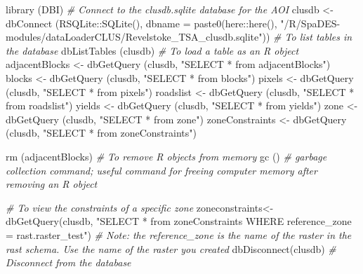 \documentclass[
]{article}
\newenvironment{Shaded}{\begin{snugshade}}{\end{snugshade}}
\newcommand{\AttributeTok}[1]{\textcolor[rgb]{0.77,0.63,0.00}{#1}}
\newcommand{\CommentTok}[1]{\textcolor[rgb]{0.56,0.35,0.01}{\textit{#1}}}
\newcommand{\FunctionTok}[1]{\textcolor[rgb]{0.00,0.00,0.00}{#1}}
\newcommand{\NormalTok}[1]{#1}
\newcommand{\OtherTok}[1]{\textcolor[rgb]{0.56,0.35,0.01}{#1}}
\newcommand{\SpecialCharTok}[1]{\textcolor[rgb]{0.00,0.00,0.00}{#1}}
\newcommand{\StringTok}[1]{\textcolor[rgb]{0.31,0.60,0.02}{#1}}
\begin{document}
\begin{Shaded}
\begin{Highlighting}[]
\FunctionTok{library}\NormalTok{ (DBI)}
\CommentTok{\# Connect to the clusdb.sqlite database for the AOI}
\NormalTok{clusdb }\OtherTok{\textless{}{-}} \FunctionTok{dbConnect}\NormalTok{ (RSQLite}\SpecialCharTok{::}\FunctionTok{SQLite}\NormalTok{(), }\AttributeTok{dbname =} \FunctionTok{paste0}\NormalTok{(here}\SpecialCharTok{::}\FunctionTok{here}\NormalTok{(), }\StringTok{"/R/SpaDES{-}modules/dataLoaderCLUS/Revelstoke\_TSA\_clusdb.sqlite"}\NormalTok{)) }
\CommentTok{\# To list tables in the database}
\FunctionTok{dbListTables}\NormalTok{ (clusdb)}
\CommentTok{\# To load a table as an R object}
\NormalTok{adjacentBlocks }\OtherTok{\textless{}{-}} \FunctionTok{dbGetQuery}\NormalTok{ (clusdb, }\StringTok{"SELECT * from adjacentBlocks"}\NormalTok{)}
\NormalTok{blocks }\OtherTok{\textless{}{-}} \FunctionTok{dbGetQuery}\NormalTok{ (clusdb, }\StringTok{"SELECT * from blocks"}\NormalTok{)}
\NormalTok{pixels }\OtherTok{\textless{}{-}} \FunctionTok{dbGetQuery}\NormalTok{ (clusdb, }\StringTok{"SELECT * from pixels"}\NormalTok{)}
\NormalTok{roadslist }\OtherTok{\textless{}{-}} \FunctionTok{dbGetQuery}\NormalTok{ (clusdb, }\StringTok{"SELECT * from roadslist"}\NormalTok{)}
\NormalTok{yields }\OtherTok{\textless{}{-}} \FunctionTok{dbGetQuery}\NormalTok{ (clusdb, }\StringTok{"SELECT * from yields"}\NormalTok{)}
\NormalTok{zone }\OtherTok{\textless{}{-}} \FunctionTok{dbGetQuery}\NormalTok{ (clusdb, }\StringTok{"SELECT * from zone"}\NormalTok{)}
\NormalTok{zoneConstraints }\OtherTok{\textless{}{-}} \FunctionTok{dbGetQuery}\NormalTok{ (clusdb, }\StringTok{"SELECT * from zoneConstraints"}\NormalTok{)}

\FunctionTok{rm}\NormalTok{ (adjacentBlocks) }\CommentTok{\# To remove R objects from memory}
\FunctionTok{gc}\NormalTok{ () }\CommentTok{\# \textquotesingle{}garbage collection\textquotesingle{} command; useful command for freeing computer memory after removing an R object}

\CommentTok{\#  To view the constraints of a specific zone}
\NormalTok{zoneconstraints}\OtherTok{\textless{}{-}}\FunctionTok{dbGetQuery}\NormalTok{(clusdb, }\StringTok{"SELECT * from zoneConstraints WHERE reference\_zone = \textquotesingle{}rast.raster\_test\textquotesingle{}"}\NormalTok{) }\CommentTok{\# Note: the reference\_zone is the name of the raster in the rast schema. Use the name of the raster you created}
\FunctionTok{dbDisconnect}\NormalTok{(clusdb) }\CommentTok{\# Disconnect from the database}
\end{Highlighting}
\end{Shaded}
\end{document}
